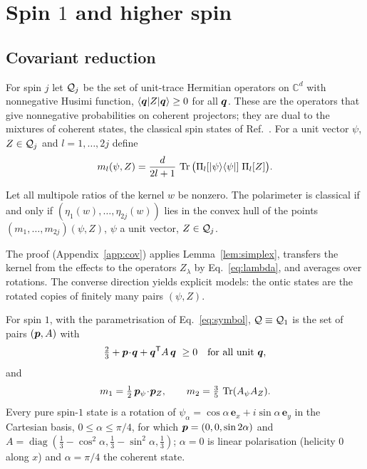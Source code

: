 \section{Spin $1$ and higher spin}
\label{sec:one}

\subsection{Covariant reduction}

For spin $j$ let $\mathcal{Q}_j$ be the set of unit-trace Hermitian operators on $\mathbb{C}^d$ with nonnegative Husimi function, $\langle\bm{q}|Z|\bm{q}\rangle\ge0$ for all $\bm{q}$. These are the operators that give nonnegative probabilities on coherent projectors; they are dual to the mixtures of coherent states, the classical spin states of Ref.~\cite{giraud2008}. For a unit vector $\psi$, $Z\in\mathcal{Q}_j$ and $l=1,\dots,2j$ define
\begin{equation}
m_l(\psi,Z)=\frac{d}{2l+1}\,\operatorname{Tr}\big(\Pi_l[|\psi\rangle\langle\psi|]\;\Pi_l[Z]\big).
\label{eq:ml}
\end{equation}

\begin{proposition}
\label{prop:cov}
Let all multipole ratios of the kernel $w$ be nonzero. The polarimeter is classical if and only if
$(\eta_1(w),\dots,\eta_{2j}(w))$ lies in the convex hull of the points $(m_1,\dots,m_{2j})(\psi,Z)$, $\psi$ a unit vector, $Z\in\mathcal{Q}_j$.
\end{proposition}

The proof (Appendix~\ref{app:cov}) applies Lemma~\ref{lem:simplex}, transfers the kernel from the effects to the operators $Z_\lambda$ by Eq.~\eqref{eq:lambda}, and averages over rotations. The converse direction yields explicit models: the ontic states are the rotated copies of finitely many pairs $(\psi,Z)$.

For spin $1$, with the parametrisation of Eq.~\eqref{eq:symbol}, $\mathcal{Q}\equiv\mathcal{Q}_1$ is the set of pairs $(\bm{p},A)$ with
\begin{equation}
\tfrac23+\bp\!\cdot\!\bq+\bq^{\T}A\,\bq\ \ge0\quad\text{for all unit }\bq ,
\label{eq:Q1}
\end{equation}
and
\begin{equation}
m_1=\tfrac12\,\bm{p}_\psi\!\cdot\!\bm{p}_Z,\qquad m_2=\tfrac35\,\operatorname{Tr}(A_\psi A_Z).
\label{eq:m12}
\end{equation}
Every pure spin-$1$ state is a rotation of $\psi_\alpha=\cos\alpha\,\bm{e}_x+i\sin\alpha\,\bm{e}_y$ in the Cartesian basis, $0\le\alpha\le\pi/4$, for which $\bm{p}=(0,0,\sin2\alpha)$ and $A=\operatorname{diag}(\tfrac13-\cos^2\!\alpha,\tfrac13-\sin^2\!\alpha,\tfrac13)$; $\alpha=0$ is linear polarisation (helicity $0$ along $x$) and $\alpha=\pi/4$ the coherent state.

